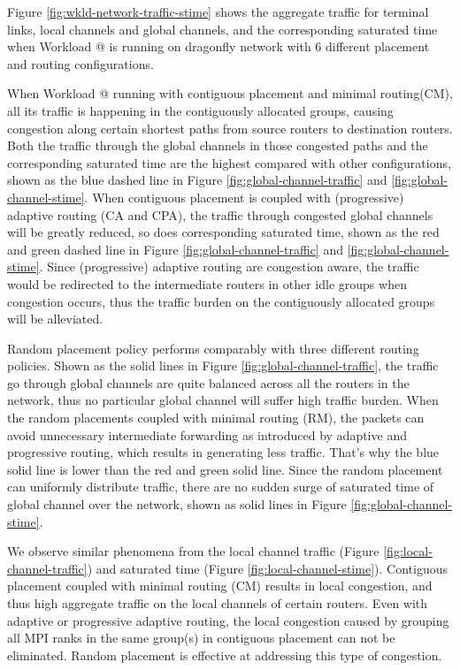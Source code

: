\documentclass[conference,compsoc]{IEEEtran}
\makeatletter
\newcommand{\Rmnum}[1]{\expandafter\@slowromancap\romannumeral #1@}
\makeatother
\begin{document}
Figure \ref{fig:wkld-network-traffic-stime} shows the aggregate traffic for terminal links, local channels and global channels, and the corresponding saturated time when Workload \Rmnum{1} is running on dragonfly network with 6 different placement and routing configurations. 

When Workload \Rmnum{1} running with contiguous placement and minimal routing(CM), all its traffic is happening in the contiguously allocated groups, causing congestion along certain shortest paths from source routers to destination routers. Both the traffic through the global channels in those congested paths and the corresponding saturated time are the highest compared with other configurations, shown as the blue dashed line in Figure \ref{fig:global-channel-traffic} and \ref{fig:global-channel-stime}.
When contiguous placement is coupled with (progressive) adaptive routing (CA and CPA), the traffic through congested global channels will be greatly reduced, so does corresponding saturated time, shown as the red and green dashed line in Figure \ref{fig:global-channel-traffic} and \ref{fig:global-channel-stime}. Since (progressive) adaptive routing are congestion aware, the traffic would be redirected to the intermediate routers in other idle groups when congestion occurs, thus the traffic burden on the contiguously allocated groups will be alleviated. 


Random placement policy performs comparably with three different routing policies.
Shown as the solid lines in Figure \ref{fig:global-channel-traffic}, the traffic go through global channels are quite balanced across all the routers in the network, thus no particular global channel will suffer high traffic burden. When the random placements coupled with minimal routing (RM), the packets can avoid unnecessary intermediate forwarding as introduced by adaptive and progressive routing, which results in generating less traffic. That's why the blue solid line is lower than the red and green solid line. Since the random placement can uniformly distribute traffic, there are no sudden surge of saturated time of global channel over the network, shown as solid lines in Figure \ref{fig:global-channel-stime}. 


We observe similar phenomena from the local channel traffic (Figure \ref{fig:local-channel-traffic}) and saturated time (Figure \ref{fig:local-channel-stime}). Contiguous placement coupled with minimal routing (CM) results in local congestion, and thus high aggregate traffic on the local channels of certain routers. Even with adaptive or progressive adaptive routing, the local congestion caused by grouping all MPI ranks in the same group(s) in contiguous placement can not be eliminated. Random placement is effective at addressing this type of congestion. 
\end{document}
